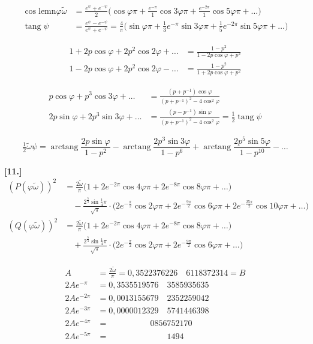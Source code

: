 \documentclass[10pt,a4paper]{article}
\newcommand{\lemn}{\text{lemn}}
\newcommand{\coslemn}{\cos\lemn}
\DeclareMathOperator{\tg}{tang}
\DeclareMathOperator{\arctg}{arctang}
\begin{document}
\begin{align*}
\coslemn\varphi\tilde{\omega} &= \frac{e^{\psi}+e^{-\psi}}{2}\bigl(\cos\varphi\pi + \tfrac{e^{-\pi}}{1}\cos 3\varphi\pi + \tfrac{e^{-2\pi}}{1}\cos 5\varphi\pi + \ldots\bigr)\\
\tg\psi &= \frac{e^{\psi}-e^{-\psi}}{e^{\psi}+e^{-\psi}} = \frac{4}{\pi}\bigl(\sin\varphi\pi + \tfrac{1}{3}e^{-\pi}\sin 3\varphi\pi + \tfrac{1}{5}e^{-2\pi}\sin 5\varphi\pi + \ldots\bigr)
\end{align*}

\begin{align*}
1+2p\cos\varphi+2p^2\cos 2\varphi+\ldots &= \frac{1-p^2}{1-2p\cos\varphi+p^2}\\
1-2p\cos\varphi+2p^2\cos 2\varphi-\ldots &= \frac{1-p^2}{1+2p\cos\varphi+p^2}
\end{align*}

\begin{align*}
p\cos\varphi+p^3\cos 3\varphi+\ldots &= \frac{(p+p^{-1})\cos\varphi}{(p+p^{-1})^2-4\cos^2\varphi}\\
2p\sin\varphi+2p^3\sin 3\varphi+\ldots &= \frac{(p-p^{-1})\sin\varphi}{(p+p^{-1})^2-4\cos^2\varphi} = \tfrac12\tg\psi
\end{align*}

\[
\tfrac{1}{2}\tilde{\omega}\psi = \arctg\frac{2p\sin\varphi}{1-p^2} - \arctg\frac{2p^3\sin 3\varphi}{1-p^6} + \arctg\frac{2p^5\sin 5\varphi}{1-p^{10}} - \ldots
\]

\medskip
\noindent\textbf{[11.]}
\begin{align*}
(P(\varphi\tilde{\omega}))^2 &= \frac{2\tilde{\omega}}{\pi}\bigl(1+2e^{-2\pi}\cos 4\varphi\pi+2e^{-8\pi}\cos 8\varphi\pi+\ldots\bigr)\\
&\quad - \frac{2^{\frac54}\sin\tfrac14\pi}{\sqrt{\pi}}\cdot\bigl(2e^{-\frac{\pi}{2}}\cos 2\varphi\pi+2e^{-\frac{9\pi}{2}}\cos 6\varphi\pi+2e^{-\frac{25\pi}{2}}\cos 10\varphi\pi+\ldots\bigr)\\
(Q(\varphi\tilde{\omega}))^2 &= \frac{2\tilde{\omega}}{\pi}\bigl(1+2e^{-2\pi}\cos 4\varphi\pi+2e^{-8\pi}\cos 8\varphi\pi+\ldots\bigr)\\
&\quad + \frac{2^{\frac54}\sin\tfrac14\pi}{\sqrt{\pi}}\cdot\bigl(2e^{-\frac{\pi}{2}}\cos 2\varphi\pi+2e^{-\frac{9\pi}{2}}\cos 6\varphi\pi+\ldots\bigr)
\end{align*}

\begin{align*}
A &= \frac{2\tilde{\omega}}{\pi} = 0{,}3522376226\quad 6118372314 = B\\
2Ae^{-\pi} &= 0{,}3535519576\quad 3585935635\\
2Ae^{-2\pi} &= 0{,}0013155679\quad 2352259042\\
2Ae^{-3\pi} &= 0{,}0000012329\quad 5741446398\\
2Ae^{-4\pi} &= \phantom{0{,}00000000}0856752170\\
2Ae^{-5\pi} &= \phantom{0{,}000000000000}1494
\end{align*}
\end{document}
